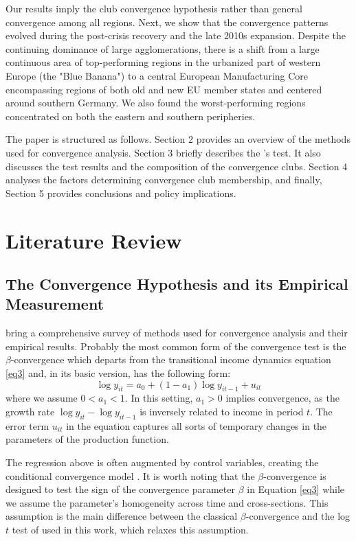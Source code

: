 \documentclass[11pt]{article}
\begin{document}
Our results imply the club convergence hypothesis rather than general convergence among all regions. Next, we show that the convergence patterns evolved during the post-crisis recovery and the late 2010s expansion. Despite the continuing dominance of large agglomerations, there is a shift from a large continuous area of top-performing regions in the urbanized part of western Europe (the "Blue Banana") to a central European Manufacturing Core encompassing regions of both old and new EU member states and centered around southern Germany. We also found the worst-performing regions concentrated on both the eastern and southern peripheries.


The paper is structured as follows. Section 2 provides an overview of the methods used for convergence analysis. Section 3 briefly describes the \citeauthor{phillips2007transition}'s test. It also discusses the test results and the composition of the convergence clubs. Section 4 analyses the factors determining convergence club membership, and finally, Section 5 provides conclusions and policy implications.  


\section{Literature Review}\label{Methodology}
\subsection{The Convergence Hypothesis and its Empirical Measurement}

\citet{eckey2007convergence} bring a comprehensive survey of methods used for convergence analysis and their empirical results. Probably the most common form of the convergence test is the $\beta$-convergence which departs from the transitional income dynamics equation \eqref{eq3} and, in its basic version, has the following form:
\begin{equation} \label{eq1}\log y_{it} = a_{0} + (1 - a_{1})\log y_{it-1} + u_{it} \end{equation}
where we assume \(0 < a_{1} < 1\). In this setting, \(a_{1} > 0 \) implies convergence, as the growth rate \(\log y_{it} - \log y_{it-1}\) is inversely related to income in period $t$. The error term $u_{it}$ in the equation captures all sorts of temporary changes in the parameters of the production function.

The regression above is often augmented by control variables, creating the conditional convergence model \citep{sala1996regional}. It is worth noting that the $\beta$-convergence is designed to test the sign of the convergence parameter $\beta$ in Equation \ref{eq3} while we assume the parameter's homogeneity across time and cross-sections. This assumption is the main difference between the classical  $\beta$-convergence and the log $t$ test of \citet{phillips2007transition} used in this work, which relaxes this assumption.
\end{document}
